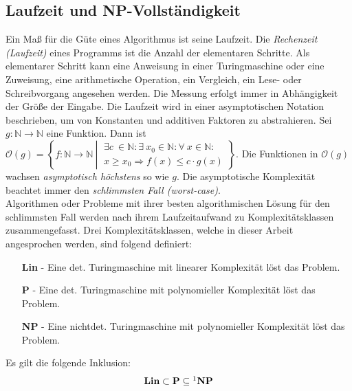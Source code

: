 \subsection{Laufzeit und NP-Vollständigkeit}
Ein Maß für die Güte eines Algorithmus ist seine Laufzeit. Die \emph{Rechenzeit (Laufzeit)} eines Programms ist die Anzahl der elementaren Schritte. Als elementarer Schritt kann eine Anweisung in einer Turingmaschine \cite{turing} oder eine Zuweisung, eine arithmetische Operation, ein Vergleich, ein Lese- oder Schreibvorgang angesehen werden.\newline\newline
Die Messung erfolgt immer in Abhängigkeit der Größe der Eingabe. Die Laufzeit wird in einer asymptotischen Notation beschrieben, um von Konstanten und additiven Faktoren zu abstrahieren.
Sei $g: {{\mathbb N}} \rightarrow {{\mathbb N}}$ eine Funktion.\newline\newline
Dann ist $\mathcal{O}(g) = \left\{ f:{{\mathbb N}} \rightarrow {{\mathbb N}} ~\left|~
\begin{array}{l}
\exists c~ \in {{\mathbb N}} : \exists~ x_0 \in {{\mathbb N}} : \forall~ x \in {{\mathbb N}} : \\
x \geq x_0 \Rightarrow f(x) \leq c \cdot g(x)
\end{array} \right. \right\}$\cite{buchwanke}.\newline\newline
Die Funktionen in $\mathcal{O}(g)$ wachsen \emph{asymptotisch h\"ochstens} so wie $g$. Die asymptotische Komplexität beachtet immer den \emph{schlimmsten Fall (worst-case)}.\\
Algorithmen oder Probleme mit ihrer besten algorithmischen Lösung für den schlimmsten Fall werden nach ihrem Laufzeitaufwand zu Komplexitätsklassen zusammengefasst. Drei Komplexitätsklassen, welche in dieser Arbeit angesprochen werden, sind folgend definiert:
\begin{itemize}
\item[\textbf{Lin}]- Eine det. Turingmaschine mit linearer Komplexität löst das Problem.
\item[\textbf{P}]- Eine det. Turingmaschine mit polynomieller Komplexität löst das Problem.
\item[\textbf{NP}]- Eine nichtdet. Turingmaschine mit polynomieller Komplexität löst das Problem.
\end{itemize}
Es gilt die folgende Inklusion: $$\textbf{Lin}\subset\textbf{P}\subseteq\footnote{\text{Ob \textbf{P}=\textbf{NP} oder \textbf{P}$\neq$ \textbf{NP} ist eines der größten noch offenen Probleme in der theoretischen Informatik}}\textbf{NP} $$
\newpage

